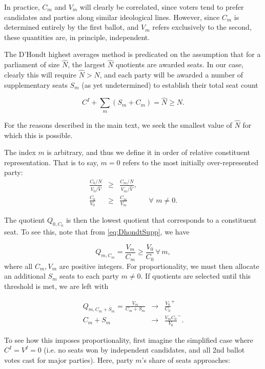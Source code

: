 \documentclass[DIV=calc, paper=a4, fontsize=11pt, twocolumn]{scrartcl}	 %
\begin{document}
In practice, $C_m$ and $V_m$ will clearly be correlated, since voters tend to prefer candidates and parties along similar ideological lines. However, since $C_m$ is determined entirely by the first ballot, and $V_m$ refers exclusively to the second, these quantities are, in principle, independent.

The D'Hondt highest averages method is predicated on the assumption that for a parliament of size $\hat{N}$, the largest $\hat{N}$ quotients are awarded seats. In our case, clearly this will require $\hat{N}>N$, and each party will be awarded a number of supplementary seats $S_m$ (as yet undetermined) to establish their total seat count 

\begin{equation}
\label{eq:sum_Sm}
C^I + \sum_m\left( S_m +C_m\right) = \hat{N} \ge N.
\end{equation}

For the reasons described in the main text, we seek the smallest value of $\hat{N}$ for which this is possible.

The index $m$ is arbitrary, and thus we define it in order of relative constituent representation. That is to say, $m=0$ refers to the most initially over-represented party:
\begin{align}
\label{eq:most_overrep}
\frac{C_0/N}{V_0/\hat{V}} &\ge& \frac{C_m/N}{V_m/\hat{V}}, \\
\frac{C_0}{V_0} &\ge& \frac{C_m}{V_m} && \forall \,\, m \neq 0.
\end{align}

The quotient $Q_{0,C_0}$ is then the lowest quotient that corresponds to a constituent seat. To see this, note that from \ref{eq:DhondtSupp}, we have 

\begin{equation}
\label{eq:QmCm}
Q_{m,C_m} = \frac{V_m}{C_m} \ge \frac{V_0}{C_0} \,  \forall \, m,
\end{equation}
where all $C_m,V_m$ are positive integers. For proportionality, we must then allocate an additional $S_m$ seats to each party $m \neq 0$. If quotients are selected until this threshold is met, we are left with

\begin{align}
\label{eq:QmSm}
Q_{m,C_m+S_m} = \frac{V_m}{C_m+S_m} &\to& \frac{V_0}{C_0}^+ \\ 
{C_m+S_m} &\to& \frac{V_mC_0}{V_0}^-.
\end{align}

To see how this imposes proportionality, first imagine the simplified case where $C^I=V^I=0$ (i.e. no seats won by independent candidates, and all 2nd ballot votes cast for major parties). Here, party $m$'s share of seats approaches:
\end{document}

